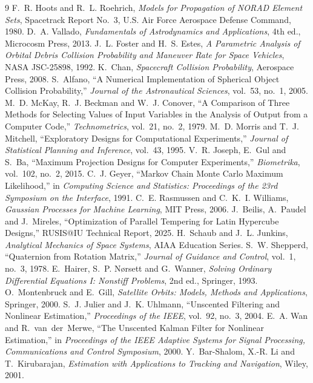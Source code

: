 \documentclass[11pt]{article}
\begin{document}
\begin{thebibliography}{9}
\small
{} F.~R. Hoots and R.~L. Roehrich,
  \emph{Models for Propagation of NORAD Element Sets}, Spacetrack Report
  No.~3, U.S. Air Force Aerospace Defense Command, 1980.
 D.~A. Vallado,
  \emph{Fundamentals of Astrodynamics and Applications}, 4th ed.,
  Microcosm Press, 2013.
 J.~L. Foster and H.~S. Estes,
  \emph{A Parametric Analysis of Orbital Debris Collision Probability and
  Maneuver Rate for Space Vehicles}, NASA JSC-25898, 1992.
 K.~Chan, \emph{Spacecraft Collision Probability},
  Aerospace Press, 2008.
 S.~Alfano, ``A Numerical Implementation of Spherical Object
  Collision Probability,'' \emph{Journal of the Astronautical Sciences},
  vol.~53, no.~1, 2005.
 M.~D. McKay, R.~J. Beckman and W.~J. Conover, ``A Comparison
  of Three Methods for Selecting Values of Input Variables in the Analysis
  of Output from a Computer Code,'' \emph{Technometrics}, vol.~21, no.~2,
  1979.
 M.~D. Morris and T.~J. Mitchell, ``Exploratory Designs for
  Computational Experiments,'' \emph{Journal of Statistical Planning and
  Inference}, vol.~43, 1995.
 V.~R. Joseph, E.~Gul and S.~Ba, ``Maximum Projection
  Designs for Computer Experiments,'' \emph{Biometrika}, vol.~102, no.~2,
  2015.
 C.~J. Geyer, ``Markov Chain Monte Carlo Maximum
  Likelihood,'' in \emph{Computing Science and Statistics: Proceedings of
  the 23rd Symposium on the Interface}, 1991.
 C.~E. Rasmussen and C.~K.~I. Williams,
  \emph{Gaussian Processes for Machine Learning}, MIT Press, 2006.
 J.~Beilis, A.~Paudel and J.~Mireles, ``Optimization of
  Parallel Tempering for Latin Hypercube Designs,'' RUSIS@IU Technical
  Report, 2025.
 H.~Schaub and J.~L. Junkins, \emph{Analytical Mechanics of
  Space Systems}, AIAA Education Series.
 S.~W. Shepperd, ``Quaternion from Rotation Matrix,''
  \emph{Journal of Guidance and Control}, vol.~1, no.~3, 1978.
 E.~Hairer, S.~P. N{\o}rsett and G.~Wanner, \emph{Solving
  Ordinary Differential Equations I: Nonstiff Problems}, 2nd ed.,
  Springer, 1993.
 O.~Montenbruck and E.~Gill, \emph{Satellite Orbits:
  Models, Methods and Applications}, Springer, 2000.
 S.~J. Julier and J.~K. Uhlmann, ``Unscented Filtering and
  Nonlinear Estimation,'' \emph{Proceedings of the IEEE}, vol.~92, no.~3,
  2004.
 E.~A. Wan and R.~van~der~Merwe, ``The Unscented Kalman Filter
  for Nonlinear Estimation,'' in \emph{Proceedings of the IEEE Adaptive
  Systems for Signal Processing, Communications and Control Symposium},
  2000.
 Y.~Bar-Shalom, X.-R. Li and T.~Kirubarajan,
  \emph{Estimation with Applications to Tracking and Navigation}, Wiley,
  2001.
\end{thebibliography}
\end{document}
